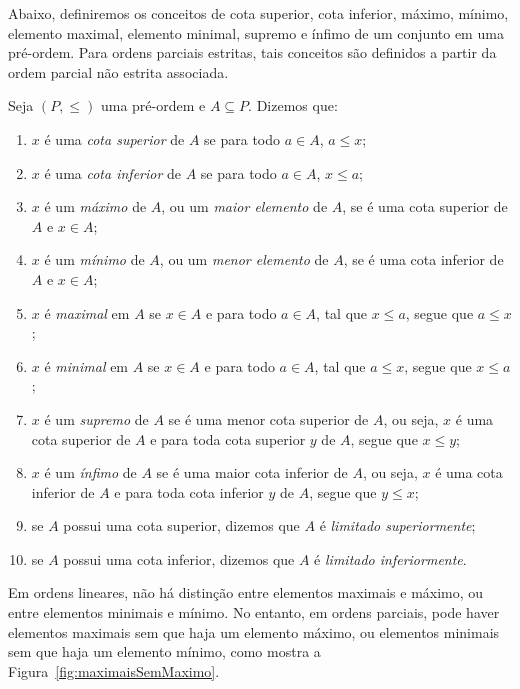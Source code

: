 Abaixo, definiremos os conceitos de cota superior, cota inferior, máximo, mínimo, elemento maximal, elemento minimal, supremo e ínfimo de um conjunto em uma pré-ordem.
Para ordens parciais estritas, tais conceitos são definidos a partir da ordem parcial não estrita associada.

\begin{definition}[$\BST$]\label{def:cotasMaximosSupremos}
    Seja $(P, \leq)$ uma pré-ordem e $A \subseteq P$. Dizemos que:
    \begin{enumerate}[label=(\roman*)]
        \item $x$ é uma \emph{cota superior} de $A$ se para todo $a \in A$, $a \leq x$;
        \item $x$ é uma \emph{cota inferior} de $A$ se para todo $a \in A$, $x \leq a$;
        \item $x$ é um \emph{máximo} de $A$, ou um \emph{maior elemento} de $A$, se é uma cota superior de $A$ e $x \in A$;
        \item $x$ é um \emph{mínimo} de $A$, ou um \emph{menor elemento} de $A$, se é uma cota inferior de $A$ e $x \in A$;
        \item $x$ é \emph{maximal} em $A$ se $x \in A$ e para todo $a \in A$, tal que $x \leq a$, segue que $a\leq x$;
        \item $x$ é \emph{minimal} em $A$ se $x \in A$ e para todo $a \in A$, tal que $a \leq x$, segue que $x \leq a$;
        \item $x$ é um \emph{supremo} de $A$ se é uma menor cota superior de $A$, ou seja, $x$ é uma cota superior de $A$ e para toda cota superior $y$ de $A$, segue que $x \leq y$;
        \item $x$ é um \emph{ínfimo} de $A$ se é uma maior cota inferior de $A$, ou seja, $x$ é uma cota inferior de $A$ e para toda cota inferior $y$ de $A$, segue que $y \leq x$;
        \item se $A$ possui uma cota superior, dizemos que $A$ é \emph{limitado superiormente};
        \item se $A$ possui uma cota inferior, dizemos que $A$ é \emph{limitado inferiormente}.
    \end{enumerate}
\end{definition}

Em ordens lineares, não há distinção entre elementos maximais e máximo, ou entre elementos minimais e mínimo.
No entanto, em ordens parciais, pode haver elementos maximais sem que haja um elemento máximo, ou elementos minimais sem que haja um elemento mínimo, como mostra a Figura~\ref{fig:maximaisSemMaximo}.

